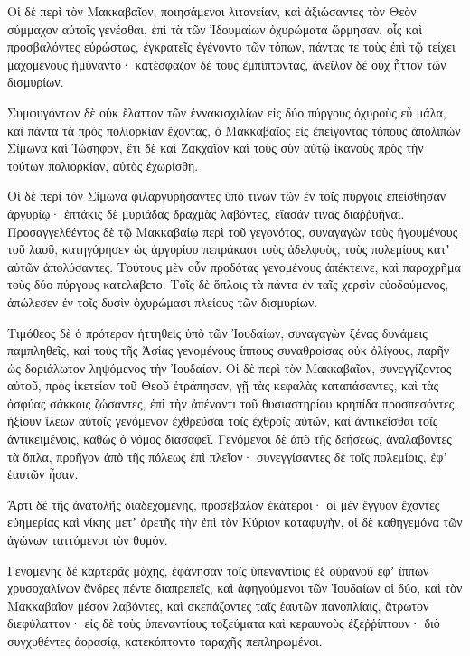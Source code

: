 {\par }{\PP {}Οἱ δὲ περὶ τὸν Μακκαβαῖον, ποιησάμενοι λιτανείαν, καὶ ἀξιώσαντες τὸν Θεὸν σύμμαχον αὐτοῖς γενέσθαι, ἐπὶ τὰ τῶν Ἰδουμαίων ὀχυρώματα ὥρμησαν,
οἷς καὶ προσβαλόντες εὐρώστως, ἐγκρατεῖς ἐγένοντο τῶν τόπων, πάντας τε τοὺς ἐπὶ τῷ τείχει μαχομένους ἠμύναντο· κατέσφαζον δὲ τοὺς ἐμπίπτοντας, ἀνεῖλον δὲ οὐχ ἧττον τῶν δισμυρίων.
\par }{\PP {}Συμφυγόντων δὲ οὐκ ἔλαττον τῶν ἐννακισχιλίων εἰς δύο πύργους ὀχυροὺς εὖ μάλα, καὶ πάντα τὰ πρὸς πολιορκίαν ἔχοντας,
ὁ Μακκαβαῖος εἰς ἐπείγοντας τόπους ἀπολιπὼν Σίμωνα καὶ Ἰώσηφον, ἔτι δὲ καὶ Ζακχαῖον καὶ τοὺς σὺν αὐτῷ ἱκανοὺς πρὸς τὴν τούτων πολιορκίαν, αὐτὸς ἐχωρίσθη.
\par }{\PP {}Οἱ δὲ περὶ τὸν Σίμωνα φιλαργυρήσαντες ὑπό τινων τῶν ἐν τοῖς πύργοις ἐπείσθησαν ἀργυρίῳ· ἑπτάκις δὲ μυριάδας δραχμὰς λαβόντες, εἴασάν τινας διαῤῥυῆναι.
Προσαγγελθέντος δὲ τῷ Μακκαβαίῳ περὶ τοῦ γεγονότος, συναγαγὼν τοὺς ἡγουμένους τοῦ λαοῦ, κατηγόρησεν ὡς ἀργυρίου πεπράκασι τοὺς ἀδελφοὺς, τοὺς πολεμίους κατʼ αὐτῶν ἀπολύσαντες.
Τούτους μὲν οὖν προδότας γενομένους ἀπέκτεινε, καὶ παραχρῆμα τοὺς δύο πύργους κατελάβετο.
Τοῖς δὲ ὅπλοις τὰ πάντα ἐν ταῖς χερσὶν εὐοδούμενος, ἀπώλεσεν ἐν τοῖς δυσὶν ὀχυρώμασι πλείους τῶν δισμυρίων.
\par }{\PP {}Τιμόθεος δὲ ὁ πρότερον ἡττηθεὶς ὑπὸ τῶν Ἰουδαίων, συναγαγὼν ξένας δυνάμεις παμπληθεῖς, καὶ τοὺς τῆς Ἀσίας γενομένους ἵππους συναθροίσας οὐκ ὀλίγους, παρῆν ὡς δοριάλωτον ληψόμενος τὴν Ἰουδαίαν.
Οἱ δὲ περὶ τὸν Μακκαβαῖον, συνεγγίζοντος αὐτοῦ, πρὸς ἱκετείαν τοῦ Θεοῦ ἐτράπησαν, γῇ τὰς κεφαλὰς καταπάσαντες, καὶ τὰς ὀσφύας σάκκοις ζώσαντες,
ἐπὶ τὴν ἀπέναντι τοῦ θυσιαστηρίου κρηπίδα προσπεσόντες, ἠξίουν ἵλεων αὐτοῖς γενόμενον ἐχθρεῦσαι τοῖς ἐχθροῖς αὐτῶν, καὶ ἀντικεῖσθαι τοῖς ἀντικειμένοις, καθὼς ὁ νόμος διασαφεῖ.
Γενόμενοι δὲ ἀπὸ τῆς δεήσεως, ἀναλαβόντες τὰ ὅπλα, προῆγον ἀπὸ τῆς πόλεως ἐπὶ πλεῖον· συνεγγίσαντες δὲ τοῖς πολεμίοις, ἐφʼ ἑαυτῶν ἦσαν.
\par }{\PP {}Ἄρτι δὲ τῆς ἀνατολῆς διαδεχομένης, προσέβαλον ἑκάτεροι· οἱ μὲν ἔγγυον ἔχοντες εὐημερίας καὶ νίκης μετʼ ἀρετῆς τὴν ἐπὶ τὸν Κύριον καταφυγὴν, οἱ δὲ καθηγεμόνα τῶν ἀγώνων ταττόμενοι τὸν θυμόν.
\par }{\PP {}Γενομένης δὲ καρτερᾶς μάχης, ἐφάνησαν τοῖς ὑπεναντίοις ἐξ οὐρανοῦ ἐφʼ ἵππων χρυσοχαλίνων ἄνδρες πέντε διαπρεπεῖς, καὶ ἀφηγούμενοι τῶν Ἰουδαίων οἱ δύο,
καὶ τὸν Μακκαβαῖον μέσον λαβόντες, καὶ σκεπάζοντες ταῖς ἑαυτῶν πανοπλίαις, ἄτρωτον διεφύλαττον· εἰς δὲ τοὺς ὑπεναντίους τοξεύματα καὶ κεραυνοὺς ἐξεῤῥίπτουν· διὸ συγχυθέντες ἀορασίᾳ, κατεκόπτοντο ταραχῆς πεπληρωμένοι.
}
